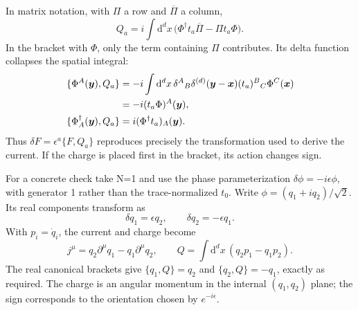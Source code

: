 \documentclass[11pt]{article}
\newcommand{\dd}{\mathrm{d}}
\begin{document}
In matrix notation, with \(\Pi\) a row and \(\overline\Pi\) a column,
\begin{equation}
 Q_a=i\int\dd^dx\,
       \bigl(\Phi^\dagger t_a\overline\Pi-\Pi t_a\Phi\bigr).
 \label{eq:charge-canonical}
\end{equation}
In the bracket with \(\Phi\), only the term containing \(\Pi\)
contributes. Its delta function collapses the spatial integral:
\begin{align}
 \{\Phi^A(\bm y),Q_a\}
 &=-i\int\dd^dx\,
 \delta^A{}_B\delta^{(d)}(\bm y-\bm x)
 (t_a)^B{}_C\Phi^C(\bm x)\notag\\
 &=-i(t_a\Phi)^A(\bm y),\label{eq:field-generator}\\
 \{\Phi_A^\dagger(\bm y),Q_a\}
 &=i(\Phi^\dagger t_a)_A(\bm y).
 \label{eq:conjugate-generator}
\end{align}
Thus \(\delta F=\epsilon^a\{F,Q_a\}\) reproduces precisely the
transformation used to derive the current. If the charge is placed first
in the bracket, its action changes sign.

\begin{remarkbox}
For a concrete check take N=1 and use the phase parameterization
\(\delta\phi=-i\epsilon\phi\), with generator 1 rather than the
trace-normalized \(t_0\). Write
\(\phi=(q_1+iq_2)/\sqrt2\). Its real components transform as
\[
 \delta q_1=\epsilon q_2,\qquad \delta q_2=-\epsilon q_1.
\]
With \(p_i=\dot q_i\), the current and charge become
\[
 j^\mu=q_2\partial^\mu q_1-q_1\partial^\mu q_2,
 \qquad Q=\int\dd^dx\,(q_2p_1-q_1p_2).
\]
The real canonical brackets give \(\{q_1,Q\}=q_2\) and
\(\{q_2,Q\}=-q_1\), exactly as required. The charge is an angular
momentum in the internal \((q_1,q_2)\) plane; the sign corresponds
to the orientation chosen by \(e^{-i\epsilon}\).
\end{remarkbox}
\end{document}
